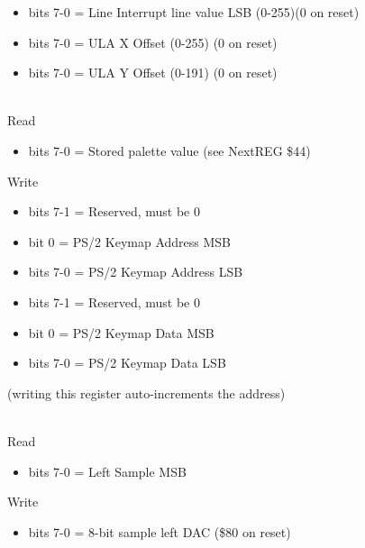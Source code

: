 \begin{itemize}
\item bits 7-0 = Line Interrupt line value LSB (0-255)(0 on reset)
\end{itemize}

\begin{itemize}
\item bits 7-0 = ULA X Offset (0-255) (0 on reset)
\end{itemize}

\begin{itemize}
\item bits 7-0 = ULA Y Offset (0-191) (0 on reset)
\end{itemize}

\\
Read
\begin{itemize}
\item bits 7-0 = Stored palette value (see NextREG \$44)
\end{itemize}
Write  
\begin{itemize}
\item bits 7-1 = Reserved, must be 0
\item bit 0 = PS/2 Keymap Address MSB
\end{itemize}

\begin{itemize}
\item bits 7-0 = PS/2 Keymap Address LSB
\end{itemize}

\begin{itemize}
\item bits 7-1 = Reserved, must be 0
\item bit 0 = PS/2 Keymap Data MSB
\end{itemize}

\begin{itemize}
\item bits 7-0 = PS/2 Keymap Data LSB
\end{itemize}
(writing this register auto-increments the address)

\\
Read
\begin{itemize}
\item bits 7-0 = \iis Left Sample MSB
\end{itemize}
Write
\begin{itemize}
\item bits 7-0 = 8-bit sample left DAC (\$80 on reset)
\end{itemize}

